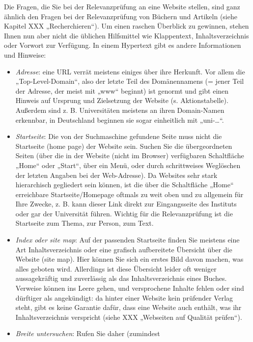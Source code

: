 \documentclass[]{book}
\providecommand{\tightlist}{%
  \setlength{\itemsep}{0pt}\setlength{\parskip}{0pt}}
\theoremstyle{definition}
\theoremstyle{definition}
\theoremstyle{definition}
\theoremstyle{remark}
\begin{document}
Die Fragen, die Sie bei der Relevanzprüfung an eine Website stellen,
sind ganz ähnlich den Fragen bei der Relevanzprüfung von Büchern und
Artikeln (siehe Kapitel XXX „Recherchieren``). Um einen raschen
Überblick zu gewinnen, stehen Ihnen nun aber nicht die üblichen
Hilfsmittel wie Klappentext, Inhaltsverzeichnis oder Vorwort zur
Verfügung. In einem Hypertext gibt es andere Informationen und Hinweise:

\begin{itemize}
\tightlist
\item
  \emph{Adresse}: eine URL verrät meistens einiges über ihre Herkunft.
  Vor allem die „Top-Level-Domain``, also der letzte Teil des
  Domänennamens (= jener Teil der Adresse, der meist mit „www`` beginnt)
  ist genormt und gibt einen Hinweis auf Ursprung und Zielsetzung der
  Website (s. Aktionstabelle). Außerdem sind z. B. Universitäten
  meistens an ihren Domain-Namen erkennbar, in Deutschland beginnen sie
  sogar einheitlich mit „uni-\ldots{}``.
\item
  \emph{Startseite}: Die von der Suchmaschine gefundene Seite muss nicht
  die Startseite (home page) der Website sein. Suchen Sie die
  übergeordneten Seiten (über die in der Website (nicht im Browser)
  verfügbaren Schaltfläche „Home`` oder „Start``, über ein Menü, oder
  durch schrittweises Weglöschen der letzten Angaben bei der
  Web-Adresse). Da Websites sehr stark hierarchisch gegliedert sein
  können, ist die über die Schaltfläche „Home`` erreichbare
  Startseite/Homepage oftmals zu weit oben und zu allgemein für Ihre
  Zwecke, z. B. kann dieser Link direkt zur Eingangsseite des Instituts
  oder gar der Universität führen. Wichtig für die Relevanzprüfung ist
  die Startseite zum Thema, zur Person, zum Text.
\item
  \emph{Index oder site map}: Auf der passenden Startseite finden Sie
  meistens eine Art Inhaltsverzeichnis oder eine grafisch aufbereitete
  Übersicht über die Website (site map). Hier können Sie sich ein erstes
  Bild davon machen, was alles geboten wird. Allerdings ist diese
  Übersicht leider oft weniger aussagekräftig und zuverlässig als das
  Inhaltsverzeichnis eines Buches. Verweise können ins Leere gehen, und
  versprochene Inhalte fehlen oder sind dürftiger als angekündigt: da
  hinter einer Website kein prüfender Verlag steht, gibt es keine
  Garantie dafür, dass eine Website auch enthält, was ihr
  Inhaltsverzeichnis verspricht (siehe XXX „Webseiten auf Qualität
  prüfen``).
\item
  \emph{Breite untersuchen}: Rufen Sie daher (zumindest

\end{itemize}
\end{document}
